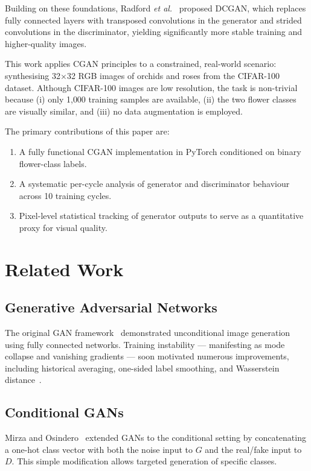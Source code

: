\documentclass[conference]{IEEEtran}
\begin{document}
Building on these foundations, Radford \emph{et al.}~\cite{radford2016} proposed DCGAN, which replaces fully connected layers with transposed convolutions in the generator and strided convolutions in the discriminator, yielding significantly more stable training and higher-quality images.

This work applies CGAN principles to a constrained, real-world scenario: synthesising 32$\times$32 RGB images of orchids and roses from the CIFAR-100 dataset. Although CIFAR-100 images are low resolution, the task is non-trivial because (i) only 1{,}000 training samples are available, (ii) the two flower classes are visually similar, and (iii) no data augmentation is employed.

The primary contributions of this paper are:
\begin{enumerate}
  \item A fully functional CGAN implementation in PyTorch conditioned on binary flower-class labels.
  \item A systematic per-cycle analysis of generator and discriminator behaviour across 10 training cycles.
  \item Pixel-level statistical tracking of generator outputs to serve as a quantitative proxy for visual quality.
\end{enumerate}

\section{Related Work}
\label{sec:related}

\subsection{Generative Adversarial Networks}
The original GAN framework~\cite{goodfellow2014} demonstrated unconditional image generation using fully connected networks. Training instability --- manifesting as mode collapse and vanishing gradients --- soon motivated numerous improvements, including historical averaging, one-sided label smoothing, and Wasserstein distance~\cite{arjovsky2017}.

\subsection{Conditional GANs}
Mirza and Osindero~\cite{mirza2014} extended GANs to the conditional setting by concatenating a one-hot class vector with both the noise input to $G$ and the real/fake input to $D$. This simple modification allows targeted generation of specific classes.
\end{document}
